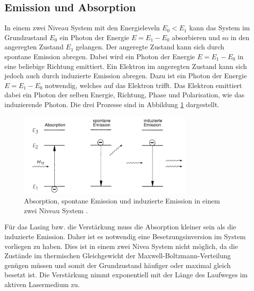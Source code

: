 \subsection{Emission und Absorption}
In einem zwei Niveau System mit den Energieleveln $E_0 < E_1$ kann das System im Grundzustand $E_0$ ein Photon der Energie $E = E_1 - E_0$ absorbieren und so in
den angeregten Zustand $E_1$ gelangen. Der angeregte Zustand kann sich durch spontane Emission abregen. Dabei wird ein Photon der Energie $E = E_1 - E_0$ in eine beliebige Richtung emittiert.
Ein Elektron im angeregten Zustand kann sich jedoch auch durch induzierte Emission abregen. Dazu ist ein Photon
der Energie $E = E_1 - E_0$ notwendig, welches auf das Elektron trifft.
Das Elektron emittiert dabei ein Photon der selben Energie, Richtung, Phase und Polarisation, wie das induzierende Photon.
Die drei Prozesse sind in Abbildung \ref{pic:emis} dargestellt.
\begin{figure}
    \centering
    \includegraphics[width = 0.78\textwidth]{pics/Emission.png}
    \caption{Absorption, spontane Emission und induzierte Emission in einem zwei Niveau System \cite{Laser}.}
    \label{pic:emis}
\end{figure}
Für das Lasing bzw. die Verstärkung muss die Absorption kleiner sein als die induzierte Emission. Daher ist es notwendig eine Besetzungsinversion im System vorliegen zu haben.
Dies ist in einem zwei Nivea System nicht möglich, da die Zustände im thermischen Gleichgewicht der Maxwell-Boltzmann-Verteilung genügen müssen und 
somit der Grundzustand häufiger oder maximal gleich besetzt ist. Die Verstärkung nimmt exponentiell mit der Länge des Laufweges im aktiven
Lasermedium zu.

